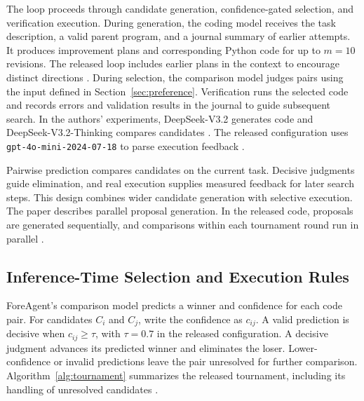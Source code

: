 The loop proceeds through candidate generation, confidence-gated selection, and verification execution. During generation, the coding model receives the task description, a valid parent program, and a journal summary of earlier attempts. It produces improvement plans and corresponding Python code for up to $m=10$ revisions. The released loop includes earlier plans in the context to encourage distinct directions \citep{foreagentcode}. During selection, the comparison model judges pairs using the input defined in Section~\ref{sec:preference}. Verification runs the selected code and records errors and validation results in the journal to guide subsequent search. In the authors' experiments, DeepSeek-V3.2 generates code and DeepSeek-V3.2-Thinking compares candidates \citep[Sections~6.2--6.3]{zheng2026predict}. The released configuration uses \texttt{gpt-4o-mini-2024-07-18} to parse execution feedback \citep{foreagentcode}.

Pairwise prediction compares candidates on the current task. Decisive judgments guide elimination, and real execution supplies measured feedback for later search steps. This design combines wider candidate generation with selective execution. The paper describes parallel proposal generation. In the released code, proposals are generated sequentially, and comparisons within each tournament round run in parallel \citep{zheng2026predict,foreagentcode}.

\subsection{Inference-Time Selection and Execution Rules}
\label{sec:selection-rules}
ForeAgent's comparison model predicts a winner and confidence for each code pair. For candidates $C_i$ and $C_j$, write the confidence as $c_{ij}$. A valid prediction is decisive when $c_{ij}\geq\tau$, with $\tau=0.7$ in the released configuration. A decisive judgment advances its predicted winner and eliminates the loser. Lower-confidence or invalid predictions leave the pair unresolved for further comparison. Algorithm~\ref{alg:tournament} summarizes the released tournament, including its handling of unresolved candidates \citep{foreagentcode}.


